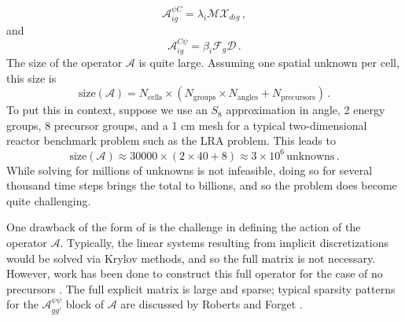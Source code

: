 \begin{equation}
 \mathcal{A}^{\psi C}_{ig} = \lambda_i \mathcal{M} \mathcal{X}_{dig} \, ,
\end{equation}
and
\begin{equation}
 \mathcal{A}^{C \psi}_{ig} = \beta_i \mathcal{F}_{g} \mathcal{D} \, .
\end{equation}
The size of the operator $\mathcal{A}$ is quite large.  Assuming
one spatial unknown per cell, this size is
\begin{equation}
 \text{size}(\mathcal{A}) = N_{\text{cells}} \times \left ( N_\text{groups} \times N_{\text{angles}} + N_{\text{precursors}} \right ) \, .
\end{equation}
To put this in context, suppose we use an $S_8$ approximation in angle,  
2 energy groups, 8 precursor groups, and a 1 cm mesh for a typical
two-dimensional reactor benchmark problem such as the LRA problem.  
This leads to
\begin{equation}
 \text{size}(\mathcal{A}) \approx 30000 \times \left ( 2 \times 40 + 8 \right )  \approx 3\times 10^6 \, \text{unknowns} \, .
\end{equation}
While solving for millions of unknowns is not infeasible, doing
so for several thousand time steps brings the total to 
billions, and so the problem does become quite challenging.

One drawback of the form of  is the 
challenge in defining the action of the operator $\mathcal{A}$.
Typically, the linear systems resulting from implicit 
discretizations would be solved via Krylov methods, and so
the full matrix is not necessary.  However, work has been done
to construct this full operator for the case of no 
precursors \cite{swesty2006std}.  The full explicit 
matrix is large and sparse; typical sparsity patterns for the
$\mathcal{A}^{\psi \psi}_{gg'}$ block of $\mathcal{A}$ are discussed
by Roberts and Forget \cite{roberts2010dsd}.


